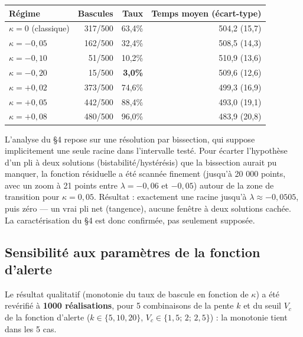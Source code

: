 \documentclass[11pt,a4paper]{article}
\begin{document}
\begin{center}
\begin{tabular}{@{}lrrr@{}}
\toprule
Régime & Bascules & Taux & Temps moyen (écart-type) \\
\midrule
$\kappa=0$ (classique) & 317/500 & 63,4\% & 504,2 (15,7) \\
$\kappa=-0{,}05$ & 162/500 & 32,4\% & 508,5 (14,3) \\
$\kappa=-0{,}10$ & 51/500 & 10,2\% & 510,9 (13,6) \\
$\kappa=-0{,}20$ & 15/500 & \textbf{3,0\%} & 509,6 (12,6) \\
$\kappa=+0{,}02$ & 373/500 & 74,6\% & 499,3 (16,9) \\
$\kappa=+0{,}05$ & 442/500 & 88,4\% & 493,0 (19,1) \\
$\kappa=+0{,}08$ & 480/500 & 96,0\% & 483,9 (20,8) \\
\bottomrule
\end{tabular}
\end{center}

\begin{remarque}
L'analyse du \S4 repose sur une résolution par bissection, qui suppose
implicitement une seule racine dans l'intervalle testé. Pour écarter
l'hypothèse d'un pli à deux solutions (bistabilité/hystérésis) que la
bissection aurait pu manquer, la fonction résiduelle a été scannée
finement (jusqu'à 20 000 points, avec un zoom à 21 points entre
$\lambda=-0{,}06$ et $-0{,}05$) autour de la zone de transition pour
$\kappa=0{,}05$. Résultat : exactement une racine jusqu'à
$\lambda\approx-0{,}0505$, puis zéro — un vrai pli net (tangence),
aucune fenêtre à deux solutions cachée. La caractérisation du \S4 est
donc confirmée, pas seulement supposée.
\end{remarque}

\subsection{Sensibilité aux paramètres de la fonction d'alerte}

Le résultat qualitatif (monotonie du taux de bascule en fonction de
$\kappa$) a été revérifié à \textbf{1000 réalisations}, pour 5
combinaisons de la pente $k$ et du seuil $V_c$ de la fonction d'alerte
($k\in\{5,10,20\}$, $V_c\in\{1{,}5;\,2;\,2{,}5\}$) : la monotonie tient
dans les 5 cas.
\end{document}
